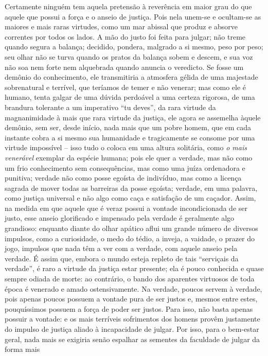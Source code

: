 Certamente ninguém tem aquela pretensão à reverência em maior grau do
que aquele que possui a força e o anseio de justiça. Pois nela unem-se e
ocultam-se as maiores e mais raras virtudes, como um mar abissal que
produz e absorve correntes por todos os lados. A mão do justo foi feita
para julgar; não treme quando segura a balança; decidido, pondera,
malgrado a si mesmo, peso por peso; seu olhar não se turva quando os
pratos da balança sobem e descem, e sua voz não soa nem forte nem
alquebrada quando anuncia o veredicto. Se fosse um demônio do
conhecimento, ele transmitiria a atmosfera gélida de uma majestade
sobrenatural e terrível, que teríamos de temer e não venerar; mas como
ele é humano, tenta galgar de uma dúvida perdoável a uma certeza
rigorosa, de uma brandura tolerante a um imperativo ``tu deves'', da
rara virtude da magnanimidade à mais que rara virtude da justiça, ele
agora se assemelha àquele demônio, sem ser, desde início, nada mais que
um pobre homem, que em cada instante cobra a si mesmo sua humanidade e
tragicamente se consome por uma virtude impossível -- isso tudo o coloca
em uma altura solitária, como \emph{o mais venerável} exemplar da
espécie humana; pois ele quer a verdade, mas não como um frio
conhecimento sem consequências, mas como uma juíza ordenadora e
punitiva; verdade não como posse egoísta de indivíduo, mas como a
licença sagrada de mover todas as barreiras da posse egoísta; verdade,
em uma palavra, como justiça universal e não algo como caça e satisfação
de um caçador. Assim, na medida em que aquele que é veraz possui a
vontade incondicionada de ser justo, esse anseio glorificado e impensado
pela verdade é geralmente algo grandioso: enquanto diante do olhar
apático aflui um grande número de diversos impulsos, como a curiosidade,
o medo do tédio, a inveja, a vaidade, o prazer do jogo, impulsos que
nada têm a ver com a verdade, com aquele anseio pela verdade. É assim
que, embora o mundo esteja repleto de tais ``serviçais da verdade'', é
raro a virtude da justiça estar presente; ela é pouco conhecida e quase
sempre odiada de morte: ao contrário, o bando dos aparentes virtuosos de
toda época é venerado e amado ostensivamente. Na verdade, poucos servem
à verdade, pois apenas poucos possuem a vontade pura de ser justos e,
mesmos entre estes, pouquíssimos possuem a força de poder ser justos.
Para isso, não basta apenas possuir a vontade: e os mais terríveis
sofrimentos dos homens provêm justamente do impulso de justiça aliado à
incapacidade de julgar. Por isso, para o bem-estar geral, nada mais se
exigiria senão espalhar as sementes da faculdade de julgar da forma mais
